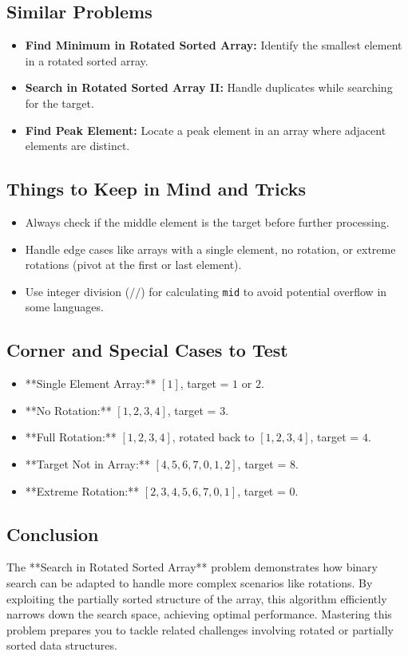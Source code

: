 \subsection*{Similar Problems}
\begin{itemize}
    \item \textbf{Find Minimum in Rotated Sorted Array:} Identify the smallest element in a rotated sorted array.
    \item \textbf{Search in Rotated Sorted Array II:} Handle duplicates while searching for the target.
    \item \textbf{Find Peak Element:} Locate a peak element in an array where adjacent elements are distinct.
\end{itemize}

\subsection*{Things to Keep in Mind and Tricks}
\begin{itemize}
    \item Always check if the middle element is the target before further processing.
    \item Handle edge cases like arrays with a single element, no rotation, or extreme rotations (pivot at the first or last element).
    \item Use integer division (\(\texttt{//}\)) for calculating \texttt{mid} to avoid potential overflow in some languages.
\end{itemize}

\subsection*{Corner and Special Cases to Test}
\begin{itemize}
    \item **Single Element Array:** \([1]\), target = \(1\) or \(2\).
    \item **No Rotation:** \([1, 2, 3, 4]\), target = \(3\).
    \item **Full Rotation:** \([1, 2, 3, 4]\), rotated back to \([1, 2, 3, 4]\), target = \(4\).
    \item **Target Not in Array:** \([4, 5, 6, 7, 0, 1, 2]\), target = \(8\).
    \item **Extreme Rotation:** \([2, 3, 4, 5, 6, 7, 0, 1]\), target = \(0\).
\end{itemize}

\subsection*{Conclusion}
The **Search in Rotated Sorted Array** problem demonstrates how binary search can be adapted to handle more complex scenarios like rotations. By exploiting the partially sorted structure of the array, this algorithm efficiently narrows down the search space, achieving optimal performance. Mastering this problem prepares you to tackle related challenges involving rotated or partially sorted data structures.